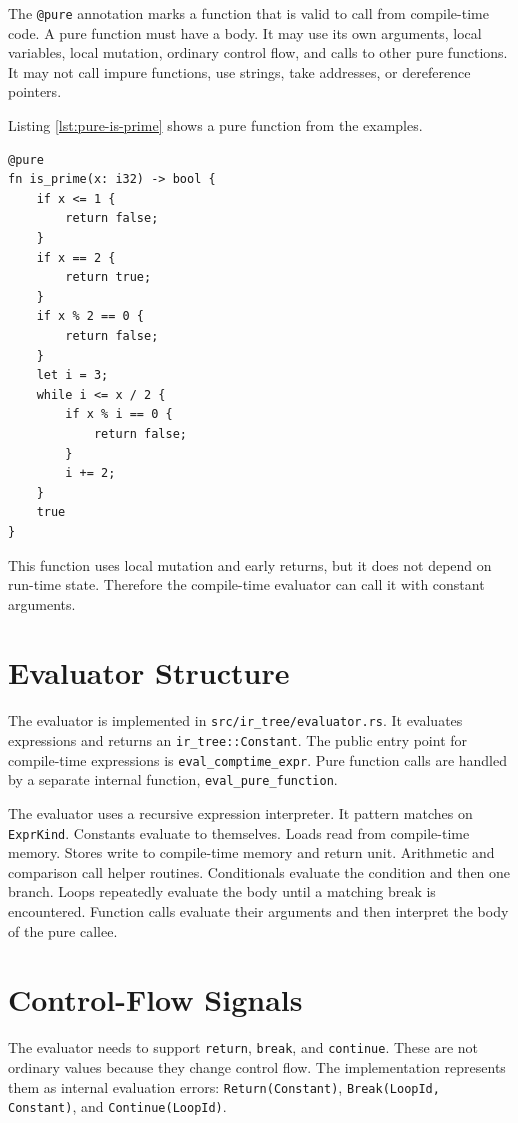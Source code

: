 The \texttt{@pure} annotation marks a function that is valid to call from
compile-time code. A pure function must have a body. It may use its own
arguments, local variables, local mutation, ordinary control flow, and calls to
other pure functions. It may not call impure functions, use strings, take
addresses, or dereference pointers.

Listing \ref{lst:pure-is-prime} shows a pure function from the examples.

\begin{lstlisting}[language=EPL,caption={Pure function used by comptime},label={lst:pure-is-prime}]
@pure
fn is_prime(x: i32) -> bool {
	if x <= 1 {
		return false;
	}
	if x == 2 {
		return true;
	}
	if x % 2 == 0 {
		return false;
	}
	let i = 3;
	while i <= x / 2 {
		if x % i == 0 {
			return false;
		}
		i += 2;
	}
	true
}
\end{lstlisting}

This function uses local mutation and early returns, but it does not depend on
run-time state. Therefore the compile-time evaluator can call it with constant
arguments.

\section{Evaluator Structure}

The evaluator is implemented in \texttt{src/ir\_tree/evaluator.rs}. It evaluates
\irtree{} expressions and returns an \texttt{ir\_tree::Constant}. The public
entry point for compile-time expressions is \texttt{eval\_comptime\_expr}. Pure
function calls are handled by a separate internal function,
\texttt{eval\_pure\_function}.

The evaluator uses a recursive expression interpreter. It pattern matches on
\texttt{ExprKind}. Constants evaluate to themselves. Loads read from compile-time
memory. Stores write to compile-time memory and return unit. Arithmetic and
comparison call helper routines. Conditionals evaluate the condition and then
one branch. Loops repeatedly evaluate the body until a matching break is
encountered. Function calls evaluate their arguments and then interpret the body
of the pure callee.

\section{Control-Flow Signals}

The evaluator needs to support \texttt{return}, \texttt{break}, and
\texttt{continue}. These are not ordinary values because they change control
flow. The implementation represents them as internal evaluation errors:
\texttt{Return(Constant)}, \texttt{Break(LoopId, Constant)}, and
\texttt{Continue(LoopId)}.

